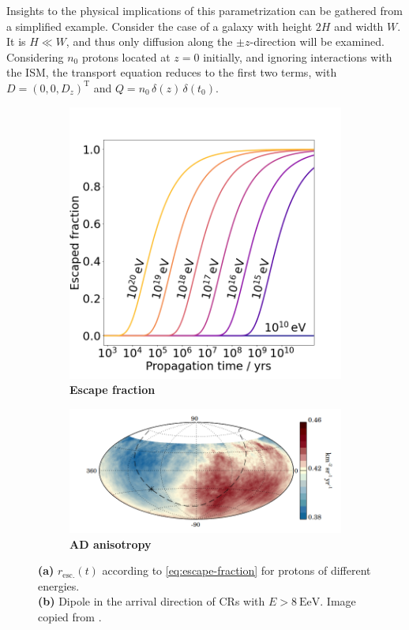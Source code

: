 Insights to the physical implications of this parametrization can be gathered from a simplified example. Consider the case of a galaxy with height $2H$ and width 
$W$. It is $H \ll W$, and thus only diffusion along the $\pm z$-direction will be examined. Considering $n_0$ protons located at $z=0$ initially, and ignoring 
interactions with the ISM, the transport equation reduces to the first two terms, with $D = \left( 0, 0, D_z \right)^\text{T}$ and 
$Q = n_0\,\delta(z)\,\delta(t_0)$.

\begin{figure}[t]
	\begin{subfigure}[b]{0.32\textwidth}
		\centering
		\includegraphics[width=\textwidth]{./plots/galactic_diffusion.png}
		\caption{\textbf{Escape fraction}}
		\label{fig:escape-fraction}
	\end{subfigure}
	\hfill
	\begin{subfigure}[b]{0.68\textwidth}
		\centering
		\includegraphics[width=\textwidth]{./plots/auger_dipole.png}
		\caption{\textbf{AD anisotropy}}
		\label{fig:ad-anisotropy}
	\end{subfigure}
	\caption{\textbf{(a)} $r_\text{esc.}(t)$ according to \autoref{eq:escape-fraction} for protons of different energies.\\ \textbf{(b)} Dipole in the arrival
	direction of CRs with $E>\SI{8}{\exa\electronvolt}$. Image copied from \cite{pierre2017observation}.}
\end{figure}

